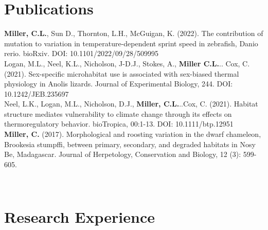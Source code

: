 \documentclass[a4paper,11pt,english]{article}
\begin{document}
\section*{Publications}
\begin{flushleft}
	\begin{itemize}
		\textbf {Miller, C.L.}, Sun D., Thornton, L.H., McGuigan, K. (2022). The contribution of mutation to variation in temperature-dependent sprint speed in zebrafish, Danio rerio. bioRxiv. DOI: 10.1101/2022/09/28/509995
		\>   \\    
		Logan, M.L., Neel, K.L., Nicholson, J-D.J., Stokes, A., \textbf{Miller C.L.}.. Cox, C. (2021). Sex-specific microhabitat use is associated with sex-biased thermal physiology in Anolis lizards. Journal of Experimental Biology, 244. DOI: 10.1242/JEB.235697
		\>   \\    
		Neel, L.K., Logan, M.L., Nicholson, D.J., \textbf{Miller, C.L.}..Cox, C. (2021). Habitat structure mediates vulnerability to climate change through its effects on thermoregulatory behavior. bioTropica, 00:1-13. DOI: 10.1111/btp.12951
		\>   \\    
		\textbf{Miller, C.} (2017). Morphological and roosting variation in the dwarf chameleon, Brookesia stumpffi, between primary, secondary, and degraded habitats in Nosy Be, Madagascar. Journal of Herpetology, Conservation and Biology, 12 (3): 599-605.
	\end{itemize}
	\>   \\    
		
\end{flushleft}

\section*{Research Experience}
\begin{flushleft}
	\>   \\ 
\end{flushleft}
\end{document}
